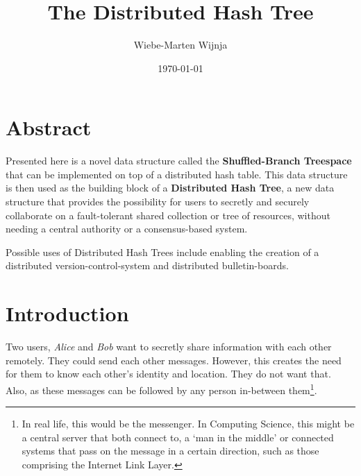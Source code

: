 \documentclass[a4paper]{article}
\begin{document}
\title{The Distributed Hash Tree
}
\date{\today}
\author{Wiebe-Marten Wijnja
}

\maketitle

\section{Abstract}

Presented here is a novel data structure called the \textbf{Shuffled-Branch Treespace} that can be implemented on top of a distributed hash table. This data structure is then used as the building block of a \textbf{Distributed Hash Tree}, a new data structure that provides the possibility for users to secretly and securely collaborate on a fault-tolerant shared collection or tree of resources, without needing a central authority or a consensus-based system.


 Possible uses of Distributed Hash Trees include enabling the creation of a distributed version-control-system and distributed bulletin-boards.


\section{Introduction}

Two users, \textit{Alice} and \textit{Bob} want to secretly share information with each other remotely. They could send each other messages. However, this creates the need for them to know each other's identity and location. They do not want that. Also, as these messages can be followed by any person in-between them\footnote{In real life, this would be the messenger. In Computing Science, this might be a central server that both connect to, a `man in the middle' or  connected systems that pass on the message in a certain direction, such as those comprising the Internet Link Layer.}.\\
\end{document}
